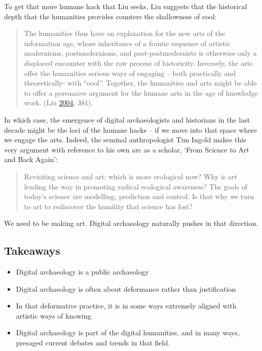 \documentclass[english,]{book}
\providecommand{\tightlist}{%
  \setlength{\itemsep}{0pt}\setlength{\parskip}{0pt}}
\begin{document}
To get that more humane hack that Liu seeks, Liu suggests that the
historical depth that the humanities provides counters the shallowness
of cool:

\begin{quote}
The humanities thus have an explanation for the new arts of the
information age, whose inheritance of a frantic sequence of artistic
modernisms, postmodernisms, and post-postmodernists is otherwise only a
displaced encounter with the raw process of historicity. Inversely, the
arts offer the humanities serious ways of engaging -- both practically
and theoretically- with ``cool''. Together, the humanities and arts
might be able to offer a persuasive argument for the humane arts in the
age of knowledge work. (Liu \protect\hyperlink{ref-liu_laws_2004}{2004},
381).
\end{quote}

In which case, the emergence of digital archaeologists and historians in
the last decade might be the loci of the humane hacks -- if we move into
that space where we engage the arts. Indeed, the seminal anthropologist
Tim Ingold makes this very argument with reference to his own arc as a
scholar, `From Science to Art and Back Again':

\begin{quote}
Revisiting science and art: which is more ecological now? Why is art
leading the way in promoting radical ecological awareness? The goals of
today's science are modelling, prediction and control. Is that why we
turn to art to rediscover the humility that science has lost?
\end{quote}

We need to be making art. Digital archaeology naturally pushes in that
direction.

\subsection{Takeaways}\label{takeaways}

\begin{itemize}
\tightlist
\item
  Digital archaeology is a public archaeology
\item
  Digital archaeology is often about deformance rather than
  justification
\item
  In that deformative practice, it is in some ways extremely aligned
  with artistic ways of knowing
\item
  Digital archaeology is part of the digital humanities, and in many
  ways, presaged current debates and trends in that field.
\end{itemize}
\end{document}
